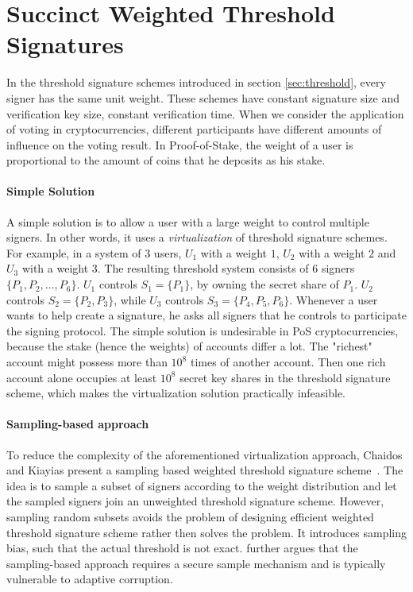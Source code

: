 \section{Succinct Weighted Threshold Signatures} \label{sec:weighted}

In the threshold signature schemes introduced in section \ref{sec:threshold}, every signer has the same unit weight. These schemes have constant signature size and verification key size, constant verification time. When we consider the application of voting in cryptocurrencies, different participants have different amounts of influence on the voting result. In Proof-of-Stake, the weight of a user is proportional to the amount of coins that he deposits as his stake. 

\paragraph{Simple Solution} A simple solution is to allow a user with a large weight to control multiple signers. In other words, it uses a \textit{virtualization} of threshold signature schemes. For example, in a system of 3 users, $U_1$ with a weight $1$, $U_2$ with a weight $2$ and $U_3$ with a weight $3$. The resulting threshold system consists of $6$ signers $\{P_1,P_2,\dots, P_6\}$. $U_1$ controls $S_1=\{P_1\}$, by owning the secret share of $P_1$. $U_2$ controls $S_2 = \{P_2,P_3\}$, while $U_3$ controls $S_3 = \{P_4, P_5, P_6\}$. Whenever a user wants to help create a signature, he asks all signers that he controls to participate the signing protocol. The simple solution is undesirable in PoS cryptocurrencies, because the stake (hence the weights) of accounts differ a lot. The "richest" account might possess more than $10^8$ times of another account. Then one rich account alone occupies at least $10^8$ secret key shares in the threshold signature scheme, which makes the virtualization solution practically infeasible. 


\paragraph{Sampling-based approach} To reduce the complexity of the aforementioned virtualization approach, Chaidos and Kiayias present a sampling based weighted threshold signature scheme~\cite{DBLP:journals/iacr/ChaidosK21}. The idea is to sample a subset of signers according to the weight distribution and let the sampled signers join an unweighted threshold signature scheme. However, sampling random subsets avoids the problem of designing efficient weighted threshold signature scheme rather then solves the problem. It introduces sampling bias, such that the actual threshold is not exact. \cite{DBLP:conf/ccs/DasCXNB023} further argues that the sampling-based approach requires a secure sample mechanism and is typically vulnerable to adaptive corruption. 

